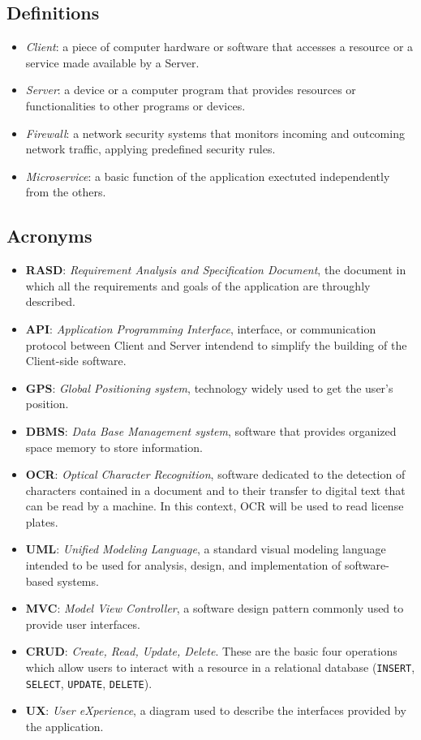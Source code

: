 \documentclass{report}
\begin{document}
\subsection{Definitions}
\begin{itemize}
    \item \textit{Client}: a piece of computer hardware or software that accesses a resource or a service made available by a Server.
    \item \textit{Server}: a device or a computer program that provides resources or functionalities to other programs or devices.
    \item \textit{Firewall}: a network security systems that monitors incoming and outcoming network traffic, applying predefined security rules.
    \item \textit{Microservice}: a basic function of the application exectuted independently from the others.
\end{itemize}
\subsection{Acronyms}
\begin{itemize}
    \item \textbf{RASD}: \textit{Requirement Analysis and Specification Document}, the document in which all the requirements and goals of the application are throughly described.
    \item \textbf{API}: \textit{Application Programming Interface}, interface, or communication protocol between Client and Server intendend to simplify the building of the Client-side software.
    \item \textbf{GPS}: \textit{Global Positioning system}, technology widely used to get the user's position.
    \item \textbf{DBMS}: \textit{Data Base Management system}, software that provides organized space memory to store information.
    \item \textbf{OCR}: \textit{Optical Character Recognition}, software dedicated to the detection of characters contained in a document and to their transfer to digital text that can be read by a machine. In this context, OCR will be used to read license plates.
    \item \textbf{UML}: \textit{Unified Modeling Language}, a standard visual modeling language intended to be used for analysis, design, and implementation of software-based systems.
    \item \textbf{MVC}: \textit{Model View Controller}, a software design pattern commonly used to provide user interfaces.
    \item \textbf{CRUD}: \textit{Create, Read, Update, Delete}. These are the basic four operations which allow users to interact with a resource in a relational database (\texttt{INSERT}, \texttt{SELECT}, \texttt{UPDATE}, \texttt{DELETE}).
    \item \textbf{UX}: \textit{User eXperience}, a diagram used to describe the interfaces provided by the application.
    \end{itemize}
\end{document}
